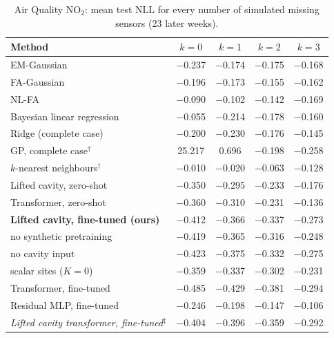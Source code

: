 \begin{table}[h]
\centering\small
\caption{\label{tab:moreairqno2}Air Quality NO$_2$: mean test NLL for every number of simulated missing sensors (23 later weeks).}
\begin{tabular}{lcccc}
\toprule
Method & $k{=}0$ & $k{=}1$ & $k{=}2$ & $k{=}3$\\
\midrule
EM-Gaussian & $-$0.237 & $-$0.174 & $-$0.175 & $-$0.168\\
FA-Gaussian & $-$0.196 & $-$0.173 & $-$0.155 & $-$0.162\\
NL-FA & $-$0.090 & $-$0.102 & $-$0.142 & $-$0.169\\
Bayesian linear regression & $-$0.055 & $-$0.214 & $-$0.178 & $-$0.160\\
Ridge (complete case) & $-$0.200 & $-$0.230 & $-$0.176 & $-$0.145\\
GP, complete case$^\dagger$ & 25.217 & 0.696 & $-$0.198 & $-$0.258\\
$k$-nearest neighbours$^\dagger$ & $-$0.010 & $-$0.020 & $-$0.063 & $-$0.128\\
Lifted cavity, zero-shot & $-$0.350 & $-$0.295 & $-$0.233 & $-$0.176\\
Transformer, zero-shot & $-$0.360 & $-$0.310 & $-$0.231 & $-$0.136\\
\textbf{Lifted cavity, fine-tuned (ours)} & $-$0.412 & $-$0.366 & $-$0.337 & $-$0.273\\
\quad no synthetic pretraining & $-$0.419 & $-$0.365 & $-$0.316 & $-$0.248\\
\quad no cavity input & $-$0.423 & $-$0.375 & $-$0.332 & $-$0.275\\
\quad scalar sites ($K=0$) & $-$0.359 & $-$0.337 & $-$0.302 & $-$0.231\\
Transformer, fine-tuned & $-$0.485 & $-$0.429 & $-$0.381 & $-$0.294\\
Residual MLP, fine-tuned & $-$0.246 & $-$0.198 & $-$0.147 & $-$0.106\\
\emph{Lifted cavity transformer, fine-tuned}$^\ddagger$ & $-$0.404 & $-$0.396 & $-$0.359 & $-$0.292\\
\bottomrule
\end{tabular}
\end{table}
